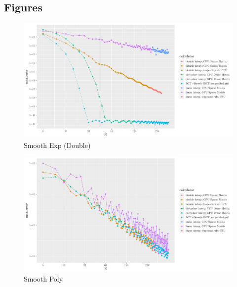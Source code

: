 \documentclass[
  letterpaper,
  landscape]{article}
\begin{document}
\hypertarget{resultsFigs}{%
\subsection{Figures}\label{resultsFigs}}

\begin{figure}

{\centering \includegraphics{myThesis_files/figure-latex/unnamed-chunk-3-1} 

}

\caption{Smooth Exp (Double)}\label{fig:unnamed-chunk-3}
\end{figure}

\begin{figure}

{\centering \includegraphics{myThesis_files/figure-latex/unnamed-chunk-4-1} 

}

\caption{Smooth Poly}\label{fig:unnamed-chunk-4}
\end{figure}
\end{document}
